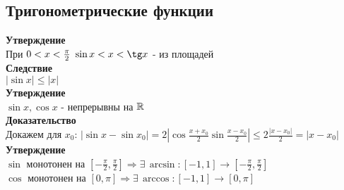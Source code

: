 \documentclass[12pt]{article}
\begin{document}
\subsection{Тригонометрические функции}
\textbf{Утверждение}\\
При $0 < x < \frac\pi2\ \sin x < x < \tg x$ - из площадей\\
\textbf{Следствие}\\
$|\sin x| \leq |x|$\\
\textbf{Утверждение}\\
$\sin x, \cos x$ - непрерывны на $\mathbb{R}$\\
\textbf{Доказательство}\\
Докажем для $x_0$: $|\sin x - \sin x_0| = 2|\cos \frac{x+x_0}{2} \sin \frac{x-x_0}{2}| \leq 2\frac{|x-x_0|}{2} = |x-x_0|$\\
\textbf{Утверждение}\\
$\sin$ монотонен на $[-\frac{\pi}{2}, \frac{\pi}{2}] \Rightarrow \exists\,\arcsin: [-1, 1] \rightarrow [-\frac{\pi}{2}, \frac{\pi}{2}]$\\
$\cos$ монотонен на $[0, \pi] \Rightarrow \exists\, \arccos: [-1, 1] \rightarrow [0, \pi]$
\end{document}
